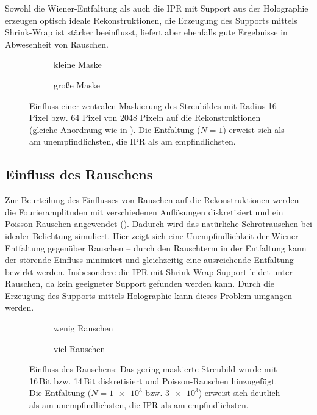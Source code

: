 Sowohl die Wiener-Entfaltung als auch die IPR mit Support aus der Holographie erzeugen optisch ideale Rekonstruktionen, die Erzeugung des Supports mittels Shrink-Wrap ist stärker beeinflusst, liefert aber ebenfalls gute Ergebnisse in Abwesenheit von Rauschen.
\begin{figure}
	\begin{subfigure}[b]{0.48\textwidth}
		\caption{kleine Maske}
	\end{subfigure}
	\hspace*{\fill}
	\begin{subfigure}[b]{0.48\textwidth}
		\caption{große Maske}	
	\end{subfigure}
	\caption[2D Rekonstruktion: Einfluss einer zentralen Maskierung]{Einfluss einer zentralen Maskierung des Streubildes mit Radius 16 Pixel bzw. 64 Pixel von 2048 Pixeln auf die Rekonstruktionen (gleiche Anordnung wie in ). Die Entfaltung ($N=1$) erweist sich als am unempfindlichsten, die IPR als am empfindlichsten.}
	\label{fig:recon2d-mask}
\end{figure}

\subsection{Einfluss des Rauschens}
Zur Beurteilung des Einflusses von Rauschen auf die Rekonstruktionen werden die Fourieramplituden mit verschiedenen Auflösungen diskretisiert und ein Poisson-Rauschen angewendet (). Dadurch wird das natürliche Schrotrauschen bei idealer Belichtung simuliert. Hier zeigt sich eine Unempfindlichkeit der Wiener-Entfaltung gegenüber Rauschen -- durch den Rauschterm in der Entfaltung kann der störende Einfluss minimiert und gleichzeitig eine ausreichende Entfaltung bewirkt werden. Insbesondere die IPR mit Shrink-Wrap Support leidet unter Rauschen, da kein geeigneter Support gefunden werden kann. Durch die Erzeugung des Supports mittels Holographie kann dieses Problem umgangen werden.
\begin{figure}
	\begin{subfigure}[b]{0.45\textwidth}
		\caption{wenig Rauschen}
	\end{subfigure}
	\hspace*{\fill}
	\begin{subfigure}[b]{0.45\textwidth}
		\caption{viel Rauschen}	
	\end{subfigure}
	\caption[2D Rekonstruktion: Einlfuss des Rauschens]{Einfluss des Rauschens: Das gering maskierte Streubild wurde mit 16\,Bit bzw. 14\,Bit diskretisiert und Poisson-Rauschen hinzugefügt. Die Entfaltung ($N=\num{1e3} \text{ bzw. }\num{3e3}$) erweist sich deutlich als am unempfindlichsten, die IPR als am empfindlichsten.}
	\label{fig:recon2d-noise}
\end{figure}
